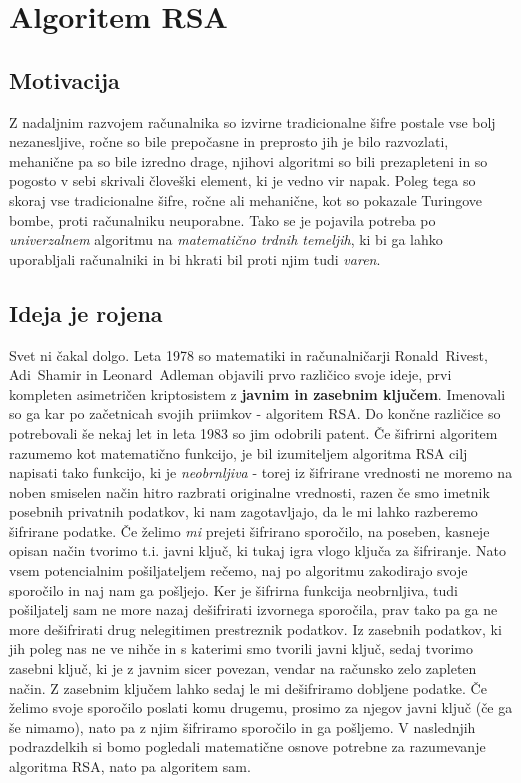 \documentclass[a4paper, 12pt]{article} %
\begin{document}
\newpage
\section{Algoritem RSA}

\subsection{Motivacija}

Z nadaljnim razvojem računalnika so izvirne tradicionalne šifre postale vse bolj nezanesljive, ročne so bile prepočasne in preprosto jih je bilo razvozlati, mehanične pa so bile izredno drage, njihovi algoritmi so bili prezapleteni in so pogosto v sebi skrivali človeški element, ki je vedno vir napak. Poleg tega so skoraj vse tradicionalne šifre, ročne ali mehanične, kot so pokazale Turingove bombe, proti računalniku neuporabne. Tako se je pojavila potreba po \emph{univerzalnem} algoritmu na \emph{matematično trdnih temeljih}, ki bi ga lahko uporabljali računalniki in bi hkrati bil proti njim tudi \emph{varen}.

\subsection{Ideja je rojena}

Svet ni čakal dolgo. Leta 1978 so matematiki in računalničarji Ronald~Rivest, Adi~Shamir in Leonard~Adleman objavili prvo različico svoje ideje, prvi kompleten asimetričen kriptosistem z \textbf{javnim in zasebnim ključem}. Imenovali so ga kar po začetnicah svojih priimkov - algoritem RSA. Do končne različice so potrebovali še nekaj let in leta 1983 so jim odobrili patent.
\newline
\newline
Če šifrirni algoritem razumemo kot matematično funkcijo, je bil izumiteljem algoritma RSA cilj napisati tako funkcijo, ki je \emph{neobrnljiva} - torej iz šifrirane vrednosti ne moremo na noben smiselen način hitro razbrati originalne vrednosti, razen če smo imetnik posebnih privatnih podatkov, ki nam zagotavljajo, da le mi lahko razberemo šifrirane podatke. Če želimo \emph{mi} prejeti šifrirano sporočilo, na poseben, kasneje opisan način tvorimo t.i. javni ključ, ki tukaj igra vlogo ključa za šifriranje. Nato vsem potencialnim pošiljateljem rečemo, naj po algoritmu zakodirajo svoje sporočilo in naj nam ga pošljejo. Ker je šifrirna funkcija neobrnljiva, tudi pošiljatelj sam ne more nazaj dešifrirati izvornega sporočila, prav tako pa ga ne more dešifrirati drug nelegitimen prestreznik podatkov. Iz zasebnih podatkov, ki jih poleg nas ne ve nihče in s katerimi smo tvorili javni ključ, sedaj tvorimo zasebni ključ, ki je z javnim sicer povezan, vendar na računsko zelo zapleten način. Z zasebnim ključem lahko sedaj le mi dešifriramo dobljene podatke. Če želimo svoje sporočilo poslati komu drugemu, prosimo za njegov javni ključ (če ga še nimamo), nato pa z njim šifriramo sporočilo in ga pošljemo.
\newline
\newline
V naslednjih podrazdelkih si bomo pogledali matematične osnove potrebne za razumevanje algoritma RSA, nato pa algoritem sam.
\end{document}
